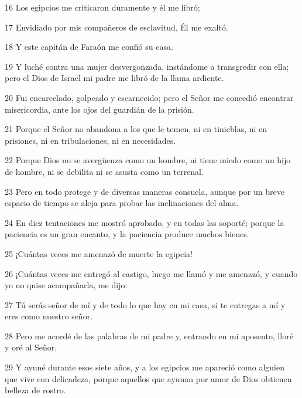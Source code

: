 \par 16 Los egipcios me criticaron duramente y él me libró;

\par 17 Envidiado por mis compañeros de esclavitud, Él me exaltó.

\par 18 Y este capitán de Faraón me confió su casa.

\par 19 Y luché contra una mujer desvergonzada, instándome a transgredir con ella; pero el Dios de Israel mi padre me libró de la llama ardiente.

\par 20 Fui encarcelado, golpeado y escarnecido; pero el Señor me concedió encontrar misericordia, ante los ojos del guardián de la prisión.

\par 21 Porque el Señor no abandona a los que le temen, ni en tinieblas, ni en prisiones, ni en tribulaciones, ni en necesidades.

\par 22 Porque Dios no se avergüenza como un hombre, ni tiene miedo como un hijo de hombre, ni se debilita ni se asusta como un terrenal.

\par 23 Pero en todo protege y de diversas maneras consuela, aunque por un breve espacio de tiempo se aleja para probar las inclinaciones del alma.

\par 24 En diez tentaciones me mostró aprobado, y en todas las soporté; porque la paciencia es un gran encanto, y la paciencia produce muchos bienes.

\par 25 ¡Cuántas veces me amenazó de muerte la egipcia!

\par 26 ¡Cuántas veces me entregó al castigo, luego me llamó y me amenazó, y cuando yo no quise acompañarla, me dijo:

\par 27 Tú serás señor de mí y de todo lo que hay en mi casa, si te entregas a mí y eres como nuestro señor.

\par 28 Pero me acordé de las palabras de mi padre y, entrando en mi aposento, lloré y oré al Señor.

\par 29 Y ayuné durante esos siete años, y a los egipcios me apareció como alguien que vive con delicadeza, porque aquellos que ayunan por amor de Dios obtienen belleza de rostro.

